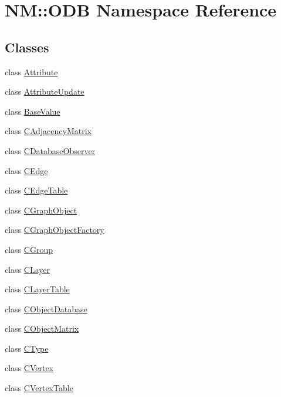 \hypertarget{namespace_n_m_1_1_o_d_b}{}\section{N\+M\+:\+:O\+D\+B Namespace Reference}
\label{namespace_n_m_1_1_o_d_b}
\subsection*{Classes}
\begin{DoxyCompactItemize}
\item 
class \hyperlink{class_n_m_1_1_o_d_b_1_1_attribute}{Attribute}
\item 
class \hyperlink{class_n_m_1_1_o_d_b_1_1_attribute_update}{Attribute\+Update}
\item 
class \hyperlink{class_n_m_1_1_o_d_b_1_1_base_value}{Base\+Value}
\item 
class \hyperlink{class_n_m_1_1_o_d_b_1_1_c_adjacency_matrix}{C\+Adjacency\+Matrix}
\item 
class \hyperlink{class_n_m_1_1_o_d_b_1_1_c_database_observer}{C\+Database\+Observer}
\item 
class \hyperlink{class_n_m_1_1_o_d_b_1_1_c_edge}{C\+Edge}
\item 
class \hyperlink{class_n_m_1_1_o_d_b_1_1_c_edge_table}{C\+Edge\+Table}
\item 
class \hyperlink{class_n_m_1_1_o_d_b_1_1_c_graph_object}{C\+Graph\+Object}
\item 
class \hyperlink{class_n_m_1_1_o_d_b_1_1_c_graph_object_factory}{C\+Graph\+Object\+Factory}
\item 
class \hyperlink{class_n_m_1_1_o_d_b_1_1_c_group}{C\+Group}
\item 
class \hyperlink{class_n_m_1_1_o_d_b_1_1_c_layer}{C\+Layer}
\item 
class \hyperlink{class_n_m_1_1_o_d_b_1_1_c_layer_table}{C\+Layer\+Table}
\item 
class \hyperlink{class_n_m_1_1_o_d_b_1_1_c_object_database}{C\+Object\+Database}
\item 
class \hyperlink{class_n_m_1_1_o_d_b_1_1_c_object_matrix}{C\+Object\+Matrix}
\item 
class \hyperlink{class_n_m_1_1_o_d_b_1_1_c_type}{C\+Type}
\item 
class \hyperlink{class_n_m_1_1_o_d_b_1_1_c_vertex}{C\+Vertex}
\item 
class \hyperlink{class_n_m_1_1_o_d_b_1_1_c_vertex_table}{C\+Vertex\+Table}
\item 

\end{DoxyCompactItemize}
